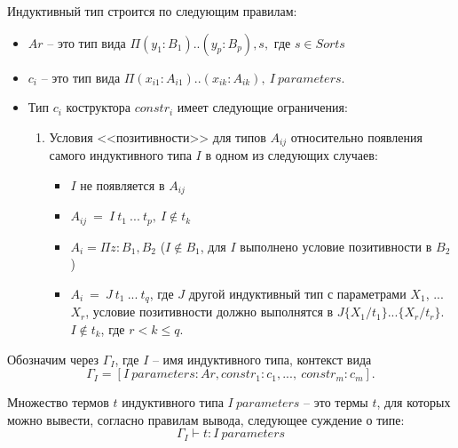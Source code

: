 \documentclass[12pt]{article}
\begin{document}
Индуктивный тип строится по следующим правилам:
\begin{itemize}
    \item $Ar$ -- это тип вида
$\Pi(y_1 : B_1)..(y_p : B_p),s,$ где $s \in Sorts$
    \item $c_i$ -- это тип вида
$\Pi(x_{i1} : A_{i1})..(x_{ik} : A_{ik}),\ I\ parameters.$

    \item Тип $c_i$ коструктора $constr_i$ имеет следующие ограничения:
    \begin{enumerate}

        \item Условия <<позитивности>> для типов $A_{ij}$ 
относительно появления самого индуктивного типа $I$
в одном из следующих случаев:
        \begin{itemize}
            \item $I$ не появляется в $A_{ij}$ 
            \item $A_{ij}\ =\ I\ t_1\ ...\ t_p,\ I \notin t_k$
            \item $A_i = \Pi z:B_1, B_2$ ($I \notin B_1$, для $I$ выполнено условие позитивности в $B_2$)
            \item $A_i\ =\ J\ t_1\ ...\ t_q$, где $J$ другой индуктивный тип с параметрами $X_1$, ... $X_r$, 
            условие позитивности должно выполнятся
            в $J\{X_1/t_1\}...\{X_r/t_r\}$. $I \notin t_k$, где $r < k \leq q$.
        \end{itemize}
    \end{enumerate}
\end{itemize}

Обозначим через $\Gamma_I$, где $I$ -- имя индуктивного типа, контекст вида $$\Gamma_I = [I\ parameters: Ar, constr_1: c_1, ..., \ constr_m: c_m].$$

Множество термов $t$ индуктивного типа $I\ parameters$ -- это термы $t$, для которых можно вывести, согласно правилам вывода, следующее суждение о типе:
$$\Gamma_I \vdash t: I\ parameters$$







\end{document}
